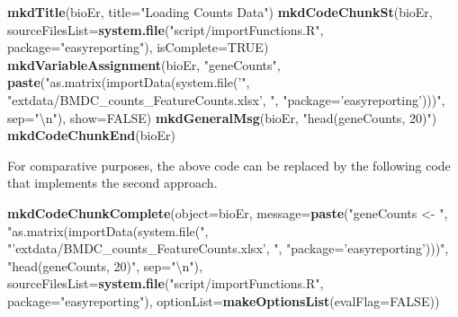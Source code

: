 \documentclass[]{article}
\newenvironment{Shaded}{\begin{snugshade}}{\end{snugshade}}
\newcommand{\CharTok}[1]{\textcolor[rgb]{0.31,0.60,0.02}{#1}}
\newcommand{\DataTypeTok}[1]{\textcolor[rgb]{0.13,0.29,0.53}{#1}}
\newcommand{\KeywordTok}[1]{\textcolor[rgb]{0.13,0.29,0.53}{\textbf{#1}}}
\newcommand{\NormalTok}[1]{#1}
\newcommand{\OtherTok}[1]{\textcolor[rgb]{0.56,0.35,0.01}{#1}}
\newcommand{\StringTok}[1]{\textcolor[rgb]{0.31,0.60,0.02}{#1}}
\begin{document}
\begin{Shaded}
\begin{Highlighting}[]
\KeywordTok{mkdTitle}\NormalTok{(bioEr, }\DataTypeTok{title=}\StringTok{"Loading Counts Data"}\NormalTok{)}
\KeywordTok{mkdCodeChunkSt}\NormalTok{(bioEr, }\DataTypeTok{sourceFilesList=}\KeywordTok{system.file}\NormalTok{(}\StringTok{"script/importFunctions.R"}\NormalTok{, }
                                    \DataTypeTok{package=}\StringTok{"easyreporting"}\NormalTok{), }\DataTypeTok{isComplete=}\OtherTok{TRUE}\NormalTok{)}
\KeywordTok{mkdVariableAssignment}\NormalTok{(bioEr, }\StringTok{"geneCounts"}\NormalTok{, }\KeywordTok{paste}\NormalTok{(}\StringTok{"as.matrix(importData(system.file('"}\NormalTok{,}
                            \StringTok{"extdata/BMDC_counts_FeatureCounts.xlsx', "}\NormalTok{,}
                            \StringTok{"package='easyreporting')))"}\NormalTok{, }\DataTypeTok{sep=}\StringTok{"}\CharTok{\textbackslash{}n}\StringTok{"}\NormalTok{), }\DataTypeTok{show=}\OtherTok{FALSE}\NormalTok{)}
\KeywordTok{mkdGeneralMsg}\NormalTok{(bioEr, }\StringTok{"head(geneCounts, 20)"}\NormalTok{)}
\KeywordTok{mkdCodeChunkEnd}\NormalTok{(bioEr)}
\end{Highlighting}
\end{Shaded}

For comparative purposes, the above code can be replaced by the
following code that implements the second approach.

\begin{Shaded}
\begin{Highlighting}[]
\KeywordTok{mkdCodeChunkComplete}\NormalTok{(}\DataTypeTok{object=}\NormalTok{bioEr, }\DataTypeTok{message=}\KeywordTok{paste}\NormalTok{(}\StringTok{"geneCounts <- "}\NormalTok{,  }
                  \StringTok{"as.matrix(importData(system.file("}\NormalTok{,}
                  \StringTok{"'extdata/BMDC_counts_FeatureCounts.xlsx', "}\NormalTok{, }
                  \StringTok{"package='easyreporting')))"}\NormalTok{, }\StringTok{"head(geneCounts, 20)"}\NormalTok{, }\DataTypeTok{sep=}\StringTok{"}\CharTok{\textbackslash{}n}\StringTok{"}\NormalTok{),}
                  \DataTypeTok{sourceFilesList=}\KeywordTok{system.file}\NormalTok{(}\StringTok{"script/importFunctions.R"}\NormalTok{, }
                  \DataTypeTok{package=}\StringTok{"easyreporting"}\NormalTok{), }
                  \DataTypeTok{optionList=}\KeywordTok{makeOptionsList}\NormalTok{(}\DataTypeTok{evalFlag=}\OtherTok{FALSE}\NormalTok{))}
\end{Highlighting}
\end{Shaded}
\end{document}
